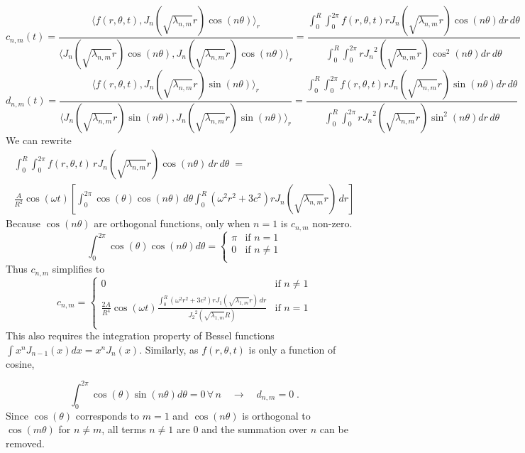 \documentclass{homework}
\begin{document}
\[ c_{n,m}(t) = \frac{\langle f(r, \theta, t), J_n (\sqrt{\lambda_{n,m}} r) \cos(n \theta) \rangle_r}{\langle J_n (\sqrt{\lambda_{n,m}} r) \cos(n \theta), J_n (\sqrt{\lambda_{n,m}} r) \cos(n \theta) \rangle_r} = \frac{\int^R_0 \int^{2 \pi}_0 f(r, \theta , t) r J_n (\sqrt{\lambda_{n,m}} r) \cos(n \theta) dr \, d \theta}{\int^R_0 \int^{2 \pi}_0 r {J_n}^2 (\sqrt{\lambda_{n,m}} r) \cos^2(n \theta) dr \, d \theta} \]
\[ d_{n,m}(t) = \frac{\langle f(r, \theta, t), J_n (\sqrt{\lambda_{n,m}} r) \sin(n \theta) \rangle_r}{\langle J_n (\sqrt{\lambda_{n,m}} r) \sin(n \theta), J_n (\sqrt{\lambda_{n,m}} r) \sin(n \theta) \rangle_r} = \frac{\int^R_0 \int^{2 \pi}_0 f(r, \theta , t) r J_n (\sqrt{\lambda_{n,m}} r) \sin(n \theta) dr \, d \theta}{\int^R_0 \int^{2 \pi}_0 r {J_n}^2 (\sqrt{\lambda_{n,m}} r) \sin^2(n \theta) dr \, d \theta} \]
\noindent
We can rewrite 
\begin{multline*}
\int^R_0 \int^{2 \pi}_0 f(r, \theta , t) \, r J_n (\sqrt{\lambda_{n,m}} r) \cos(n \theta) \, dr \, d \theta \;=\\ \frac{A}{R^2} \cos(\omega t) \left[ \int^{2 \pi}_0 \cos(\theta) \cos(n \theta) \, d \theta \int^R_0 (\omega^2 r^2 + 3c^2)  r J_n (\sqrt{\lambda_{n,m}} r) \, d r \right]
\end{multline*}
\noindent
Because $\cos(n \theta)$ are orthogonal functions, only when $n = 1$ is $c_{n,m}$ non-zero.
\[ \int^{2 \pi}_0 \cos(\theta) \cos(n \theta) d \theta = 
\begin{cases}
      \pi & \text{if $n=1$}\\
      0 & \text{if $n \neq 1$}\\
    \end{cases}
\]
\noindent
Thus $c_{n,m}$ simplifies to 
\[ c_{n,m} = 
\begin{cases}
      0 & \text{if $n \neq 1$}\\
      \frac{2A}{R^4} \cos(\omega t) \frac{\int^R_0 (\omega^2 r^2 + 3c^2)  r J_1 (\sqrt{\lambda_{1,m}} r) \, d r}{{J_2}^2 (\sqrt{\lambda_{1,m}} R) } & \text{if $n = 1$}\\
    \end{cases}
\]
\noindent
This also requires the integration property of Bessel functions $\int x^n J_{n-1}(x) dx = x^n J_n(x)$. Similarly, as $f(r, \theta, t)$ is only a function of cosine, 

\[ \int^{2 \pi}_0 \cos(\theta) \sin(n \theta) d \theta = 0 \,\forall \, n \quad \rightarrow \quad d_{n,m} = 0 \; .\]
\noindent
Since $\cos(\theta)$ corresponds to $m = 1$ and $\cos(n \theta)$ is orthogonal to $\cos(m \theta)$ for $ n \neq m$, all terms $n \neq 1$ are 0 and the summation over $n$ can be removed.
\end{document}
